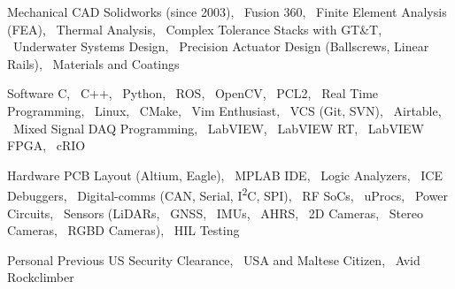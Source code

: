 
\begin{cvskills}

  \cvskill%
      {Mechanical}
      {
            CAD Solidworks (since 2003),
            \ Fusion 360,
            \ Finite Element Analysis (FEA),
            \ Thermal Analysis,
            \ Complex Tolerance Stacks with GT\&T,
            \ Underwater Systems Design,
            \ Precision Actuator Design (Ballscrews, Linear Rails), 
            \ Materials and Coatings
      }

  \cvskill%
      {Software}
      {
            C,  
            \ C++,  
            \ Python,  
            \ ROS,  
            \ OpenCV,  
            \ PCL2,
            \ Real Time Programming,  
            \ Linux,  
            \ CMake,  
            \ Vim Enthusiast,
            \ VCS (Git, SVN),  
            \ Airtable,
            \ Mixed Signal DAQ Programming,  
            \ LabVIEW,  
            \ LabVIEW RT,  
            \ LabVIEW FPGA,  
            \ cRIO
        }

  \cvskill%
      {Hardware} 
      {
            PCB Layout (Altium, Eagle),
            \ MPLAB IDE, 
            \ Logic Analyzers, 
            \ ICE Debuggers, 
            \ Digital-comms (CAN, Serial, I\textsuperscript{2}C, SPI),
            \ RF SoCs, 
            \ uProcs, 
            \ Power Circuits, 
            \ Sensors (LiDARs, 
            \ GNSS, 
            \ IMUs, 
            \ AHRS, 
            \ 2D Cameras, 
            \ Stereo Cameras,  
            \ RGBD Cameras),
            \ HIL Testing
      }


  \cvskill%
      {Personal}
      {
            Previous US Security Clearance, 
            \ USA and Maltese Citizen, 
            \ Avid Rockclimber
      }

\end{cvskills}
